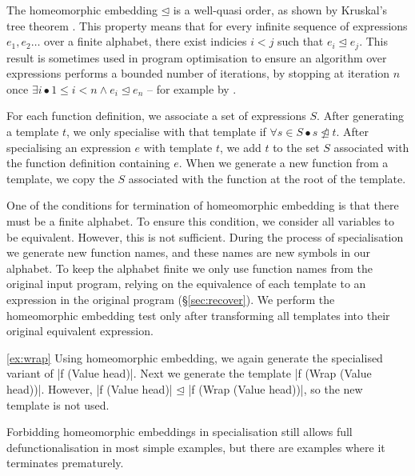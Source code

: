 \documentclass{sigplanconf}
\begin{document}
The homeomorphic embedding $\unlhd$ is a well-quasi order, as shown by Kruskal's tree theorem \cite{kruskal:tree}. This property means that for every infinite sequence of expressions $e_1,e_2 \ldots$ over a finite alphabet, there exist indicies $i < j$ such that $e_i \unlhd e_j$. This result is sometimes used in program optimisation to ensure an algorithm over expressions performs a bounded number of iterations, by stopping at iteration $n$ once $\exists i \bullet 1 \leq i < n \wedge e_i \unlhd e_n$ -- for example by \citet{jonsson:supercompilation}.

For each function definition, we associate a set of expressions $S$. After generating a template $t$, we only specialise with that template if $\forall s \in S \bullet s \ntrianglelefteq t$. After specialising an expression $e$ with template $t$, we add $t$ to the set $S$ associated with the function definition containing $e$. When we generate a new function from a template, we copy the $S$ associated with the function at the root of the template.

One of the conditions for termination of homeomorphic embedding is that there must be a finite alphabet. To ensure this condition, we consider all variables to be equivalent. However, this is not sufficient. During the process of specialisation we generate new function names, and these names are new symbols in our alphabet. To keep the alphabet finite we only use function names from the original input program, relying on the equivalence of each template to an expression in the original program (\S\ref{sec:recover}). We perform the homeomorphic embedding test only after transforming all templates into their original equivalent expression.

\begin{examplerevisit}{\ref{ex:wrap}}
Using homeomorphic embedding, we again generate the specialised variant of |f (Value head)|. Next we generate the template |f (Wrap (Value head))|. However, |f (Value head)| $\unlhd{}$ |f (Wrap (Value head))|, so the new template is not used.
\end{examplerevisit}

Forbidding homeomorphic embeddings in specialisation still allows full defunctionalisation in most simple examples, but there are examples where it terminates prematurely.
\end{document}
